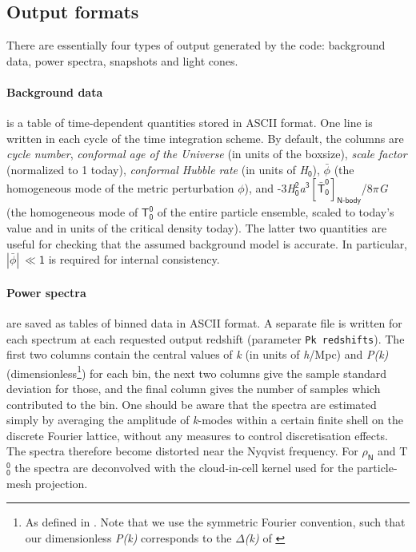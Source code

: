 \documentclass[a4paper,10pt]{article}
\begin{document}
\subsection{Output formats}
\label{sec:output}

There are essentially four types of output generated by the code: background data, power spectra, snapshots and light cones.

\paragraph{Background data} is a table of time-dependent quantities stored in ASCII format. One line is written in each cycle of the time
integration scheme. By default, the columns are \textit{cycle number}, \textit{conformal age of the Universe} (in units of the boxsize),
\textit{scale factor} (normalized to 1 today), \textit{conformal Hubble rate} (in units of \textit{H}${}_\mathsf{0}$), $\bar{\mathsf{\phi}}$
(the homogeneous mode of the metric perturbation $\mathsf{\phi}$), and -3\textit{H}${}_\mathsf{0}^\mathsf{2}$\textit{a}$^\mathsf{3}
[\mathsf{\bar{T}^0_0}]_\mathsf{N\text{-}body}$/8$\mathsf{\pi}$\textit{G} (the homogeneous mode of $\mathsf{T^0_0}$ of the entire particle
ensemble, scaled to today's value and in units of the critical density today). The latter two quantities are useful for checking that the
assumed background model is accurate. In particular, $|\bar{\mathsf{\phi}}|~ \mathsf{\ll 1}$ is required for internal consistency.

\paragraph{Power spectra} are saved as tables of binned data in ASCII format. A separate file is written for each spectrum at each requested
output redshift (parameter \texttt{Pk redshifts}). The first two columns contain the central values of \textit{k} (in units of
\textit{h}/Mpc) and \textit{P(k)} (dimensionless\footnote{As defined in \cite{Adamek:2015eda}. Note that we use the symmetric Fourier
convention, such that our dimensionless \textit{P(k)} corresponds to the $\mathsf{\Delta}$\textit{(k)} of \cite{Bernardeau:2001qr}}) for
each bin, the next two columns give the sample standard deviation for those, and the final column gives the number of samples which
contributed to the bin.
One should be aware that the spectra are estimated simply by averaging the amplitude of \textit{k}-modes within a certain finite shell on
the discrete Fourier lattice, without any measures to control discretisation effects. The spectra therefore become distorted near the
Nyqvist frequency. For $\mathsf{\rho}_\mathsf{N}$ and T$^\mathsf{0}_\mathsf{0}$ the spectra are deconvolved with the cloud-in-cell kernel
used for the particle-mesh projection.
\end{document}
